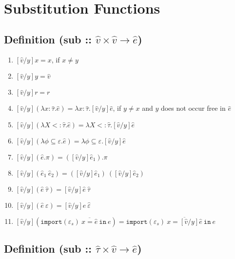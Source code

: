 \documentclass{llncs}
\newcommand{\keywadj}[1]{\mathtt{#1}}
\newcommand{\keyw}[1]{\keywadj{#1}~}
\newcommand{\kw}[1]{\keyw{ #1 }}
\newcommand{\kwa}[1]{\keywadj{ #1 }}
\begin{document}
\section{Substitution Functions}

\subsection*{Definition (sub :: $\hat v \times \hat v \rightarrow \hat e$)}

\begin{enumerate}
	\item $[\hat v/y]x = x$, if $x \neq y$
	\item $[\hat v/y]y = \hat v$
	\item $[\hat v/y]r = r$
	\item $[\hat v/y](\lambda x: \hat \tau. \hat e) = \lambda x: \hat \tau. [\hat v/y]\hat e$, if $y \neq x$ and $y$ does not occur free in $\hat e$
	\item $[\hat v/y](\lambda X <: \hat \tau. \hat e) = \lambda X <: \hat \tau. [\hat v/y]\hat e$
	\item $[\hat v/y](\lambda \phi \subseteq \varepsilon. \hat e) = \lambda \phi \subseteq \varepsilon. [\hat v/y]\hat e$
	\item $[\hat v/y](\hat e.\pi) = ([\hat v/y]\hat e_1).\pi$
	\item $[\hat v/y](\hat e_1~\hat e_2) = ([\hat v/y]\hat e_1)~([\hat v/y]\hat e_2)$
	\item $[\hat v/y](\hat e~\hat \tau) = [\hat v/y]\hat e~\hat \tau$
	\item $[\hat v/y](\hat e~\varepsilon) = [\hat v/y]\hat e~\hat \varepsilon$
	\item $[\hat v/y](\kwa{import}(\varepsilon_s)~\overline{x = \hat e}~\kw{in} e) = \kwa{import}(\varepsilon_s)~\overline{x = [\hat v/y]\hat e}~\kw{in} e$
\end{enumerate}

\subsection*{Definition (sub :: $\hat \tau \times \hat v \rightarrow \hat e$)}
\end{document}
